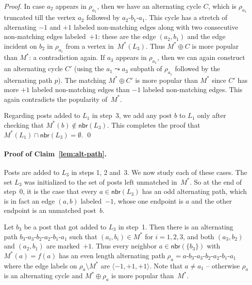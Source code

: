 \documentclass[11pt]{llncs}
\newcommand{\Nbr}{\mathsf{nbr}}
\begin{document}
\begin{proof}
In case $a_2$ appears in $\rho_{a_1}$, then we have an alternating cycle $C$, which is $\rho_{a_1}$ 
truncated till the vertex $a_2$ followed by $a_2$-$b_1$-$a_1$. This cycle has a stretch of 
alternating $-1$ and $+1$ labeled non-matching edges along with two consecutive non-matching 
edges labeled~$+1$: these are the edge $(a_2,b_1)$ and the edge incident on $b_2$ in $\rho_{a_1}$ from a vertex 
in~$M^*(L_3)$. Thus $M^* \oplus C$ is more popular than $M^*$: a contradiction again. If $a_3$ 
appears in  $\rho_{a_1}$, then we can again construct an alternating cycle $C'$ 
(using the $a_1 \leadsto a_3$ subpath of $\rho_{a_1}$ followed by the alternating path $p$).
The matching $M^* \oplus C'$ is more popular than $M^*$ since $C'$ 
has more $+1$ labeled non-matching edges than $-1$ labeled non-matching edges. This again
contradicts the popularity of~$M^*$.


Regarding posts added to $L_1$ in step~3, we add any post $b$ to $L_1$ only after checking that 
$M^*(b) \notin \Nbr(L_3)$. This completes the proof that $M^*(L_1) \cap \Nbr(L_3) = \emptyset$. \qed
\end{proof}


\paragraph{Proof of Claim~\ref{lem:alt-path}.}
Posts are added to $L_3$ in steps 1, 2 and~3. We now study each of these cases. The set $L_3$ was initialized to the set of posts left unmatched in~$M^*$. So at the end of step~0, it is the case that every $a \in \Nbr(L_3)$ has an odd alternating path, which is in fact an edge $(a,b)$ labeled~$-1$, whose one endpoint is $a$ and the
other endpoint is an unmatched post~$b$.

Let $b_3$ be a post that got added to $L_3$ in step~1. Then there is an alternating path 
$b_3$-$a_3$-$b_2$-$a_2$-$b_1$-$a_1$ such that $(a_i,b_i) \in M^*$ for $i = 1,2,3$, and both $(a_3,b_2)$ and 
$(a_2,b_1)$ are marked~$+1$. Thus every neighbor $a \in \Nbr(\{b_3\})$ with $M^*(a) = f(a)$ has an even 
length alternating path $\rho_a = a$-$b_3$-$a_3$-$b_2$-$a_2$-$b_1$-$a_1$ where the edge labels on $\rho_a \setminus M^*$ 
are $\langle -1,+1,+1\rangle$. Note that $a \ne a_1$ -- otherwise $\rho_a$ is an alternating cycle and
$M^* \oplus \rho_a$ is more popular than~$M^*$.
\end{document}
